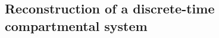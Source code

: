\documentclass[11pt,a4paper]{article}
\begin{document}
\subsection{Reconstruction of a discrete-time compartmental system}
    
\end{document}
